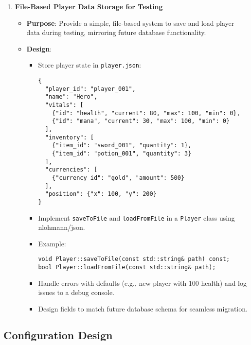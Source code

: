 \begin{enumerate}
    \item \textbf{File-Based Player Data Storage for Testing}
        \begin{itemize}
            \item \textbf{Purpose}: Provide a simple, file-based system to save and load player data during testing, mirroring future database functionality.
            \item \textbf{Design}:
                \begin{itemize}
                    \item Store player state in \texttt{player.json}:
                    \begin{lstlisting}[style=htmlstyle]
{
  "player_id": "player_001",
  "name": "Hero",
  "vitals": [
    {"id": "health", "current": 80, "max": 100, "min": 0},
    {"id": "mana", "current": 30, "max": 100, "min": 0}
  ],
  "inventory": [
    {"item_id": "sword_001", "quantity": 1},
    {"item_id": "potion_001", "quantity": 3}
  ],
  "currencies": [
    {"currency_id": "gold", "amount": 500}
  ],
  "position": {"x": 100, "y": 200}
}
                    \end{lstlisting}
                    \item Implement \texttt{saveToFile} and \texttt{loadFromFile} in a \texttt{Player} class using nlohmann/json.
                    \item Example:
                    \begin{lstlisting}[style=htmlstyle]
void Player::saveToFile(const std::string& path) const;
bool Player::loadFromFile(const std::string& path);
                    \end{lstlisting}
                    \item Handle errors with defaults (e.g., new player with 100 health) and log issues to a debug console.
                    \item Design fields to match future database schema for seamless migration.
                \end{itemize}
        \end{itemize}
\end{enumerate}















\subsection{Configuration Design}


